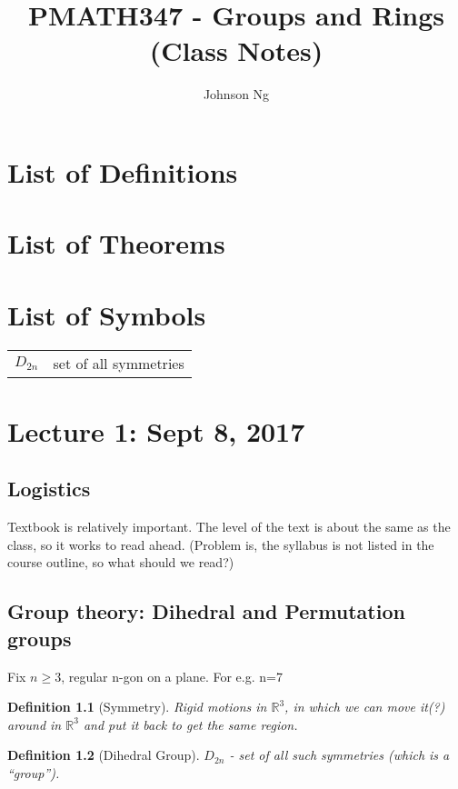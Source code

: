\documentclass[11pt, oneside]{book}
\title{PMATH347 - Groups and Rings (Class Notes)}
\author{Johnson Ng}
\theoremstyle{break}
\newtheorem{defn}{Definition}[section]
\newcommand{\bb}[1]{\mathbb{#1}}			%
\begin{document}
\maketitle
\tableofcontents

\chapter*{List of Definitions}

\chapter*{List of Theorems}

\chapter*{List of Symbols}\label{symbol_list}
\begin{tabular}{c l}
    $D_{2n}$    &   set of all symmetries
\end{tabular}

\chapter{Lecture 1: Sept 8, 2017}\label{lec1}

\section{Logistics}
Textbook is relatively important. The level of the text is about the same as the class, so it works to read ahead. (Problem is, the syllabus is not listed in the course outline, so what should we read?)

\section{Group theory: Dihedral and Permutation groups}
Fix $n \geq 3$, regular n-gon on a plane. For e.g. n=7

\begin{defn}[Symmetry]
	Rigid motions in $\bb{R}^3$, in which we can move it(?) around in $\bb{R}^3$ and put it back to get the same region.
\end{defn}

\begin{defn}[Dihedral Group]
	$D_{2n}$ - set of all such symmetries (which is a ``group'').
\end{defn}
\end{document}
